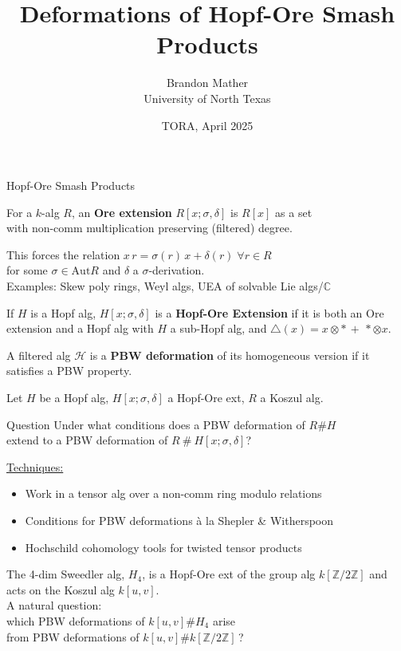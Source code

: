 \documentclass{beamer}
\title{Deformations of Hopf-Ore Smash Products}
\author{Brandon Mather\\ University of North Texas}
\date{TORA, April 2025}
\begin{document}
\maketitle

\begin{frame}{Hopf-Ore Smash Products}
\begin{definition}
    For a \(k\)-alg \(R\), an \textbf{Ore extension} \(R[x;\sigma,\delta]\) is \(R[x]\) as a set \\with non-comm multiplication preserving (filtered) degree. 
\end{definition}
This forces the relation \(x\,r=\sigma(r)\,x+\delta(r)\;\forall r\in R\) \\ for some \(\sigma\in \text{Aut}R\) and \(\delta\) a \(\sigma\)-derivation.
\\Examples: Skew poly rings, Weyl algs, UEA of solvable Lie algs/\(\mathbb{C}\)
\begin{definition}
    If \(H\) is a Hopf alg, \(H[x;\sigma,\delta]\) is a \textbf{Hopf-Ore Extension} if it is both an Ore extension and a Hopf alg with \(H\) a sub-Hopf alg, and \(\triangle(x)=x\otimes \ast\,+\,*\otimes x\).
\end{definition}
\begin{definition}
    A filtered alg \(\mathcal{H}\) is a \textbf{PBW deformation} of its homogeneous version if it satisfies a PBW property.
\end{definition}
\end{frame}

\begin{frame} 
    Let \(H\) be a Hopf alg, \(H[x;\sigma,\delta]\) a Hopf-Ore ext, \(R\) a Koszul alg.
\begin{beamerboxesrounded}{Question}
    Under what conditions does a PBW deformation of \(R\#H\) \\extend to a PBW deformation of \(R\ \#\ H[x;\sigma,\delta]\)?
\end{beamerboxesrounded}

\underline{Techniques:}
\begin{itemize}
    \item Work in a tensor alg over a non-comm ring modulo relations
    \item Conditions for PBW deformations \`a la Shepler \& Witherspoon
    \item Hochschild cohomology tools for twisted tensor products
\end{itemize}
\begin{example}
   The 4-dim Sweedler alg, \(H_4\), is a  Hopf-Ore ext of the group alg \(k[\mathbb{Z}/2\mathbb{Z}]\) and acts on the Koszul alg \(k[u,v]\).
   \\A natural question: \\which PBW deformations of \(k[u,v]\#H_4\) arise \\ \hspace{0.2cm}from PBW deformations of \(k[u,v]\#k[\mathbb{Z}/2\mathbb{Z}]\)\,?
\end{example}

\end{frame}
\end{document}
